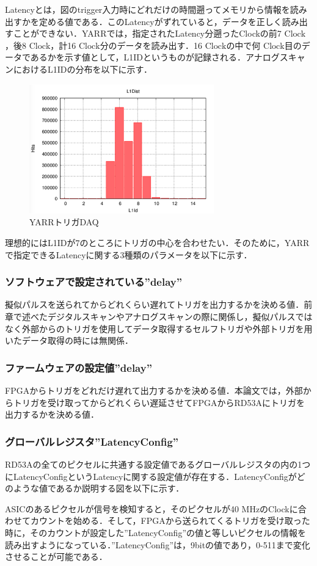 Latencyとは，図のtrigger入力時にどれだけの時間遡ってメモリから情報を読み出すかを定める値である．このLatencyがずれていると，データを正しく読み出すことができない．YARRでは，指定されたLatency分遡ったClockの前7 $\mathrm{Clock}$，後8 $\mathrm{Clock}$，計16 $\mathrm{Clock}$分のデータを読み出す．16 $\mathrm{Clock}$の中で何 $\mathrm{Clock}$目のデータであるかを示す値として，L1IDというものが記録される．アナログスキャンにおけるL1IDの分布を以下に示す．\par
\begin{figure}[h]
  \centering
  \includegraphics[width=8cm]{./figure/l1dist.png}
  \caption{YARRトリガDAQ}
  \label{fig:YARRDAQ}
\end{figure}

理想的にはL1IDが7のところにトリガの中心を合わせたい．そのために，YARRで指定できるLatencyに関する3種類のパラメータを以下に示す．

\subsubsection*{ソフトウェアで設定されている''delay''}
擬似パルスを送られてからどれくらい遅れてトリガを出力するかを決める値．前章で述べたデジタルスキャンやアナログスキャンの際に関係し，擬似パルスではなく外部からのトリガを使用してデータ取得するセルフトリガや外部トリガを用いたデータ取得の時には無関係．

\subsubsection*{ファームウェアの設定値''delay''}
FPGAからトリガをどれだけ遅れて出力するかを決める値．本論文では，外部からトリガを受け取ってからどれくらい遅延させてFPGAからRD53Aにトリガを出力するかを決める値．

\subsubsection*{グローバルレジスタ''LatencyConfig''}
RD53Aの全てのピクセルに共通する設定値であるグローバルレジスタの内の1つにLatencyConfigというLatencyに関する設定値が存在する．LatencyConfigがどのような値であるか説明する図を以下に示す．\par
ASICのあるピクセルが信号を検知すると，そのピクセルが40 $\mathrm{MHz}$のClockに合わせてカウントを始める．そして，FPGAから送られてくるトリガを受け取った時に，そのカウントが設定した''LatencyConfig''の値と等しいピクセルの情報を読み出すようになっている．''LatencyConfig''は，9bitの値であり，0-511まで変化させることが可能である．


